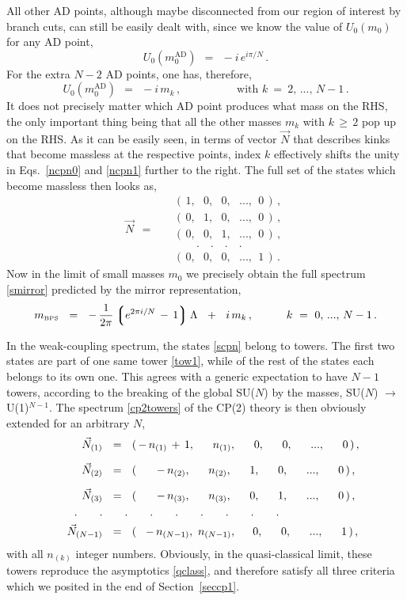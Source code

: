 \documentclass[epsfig,12pt]{article}
\def\beq{\begin{equation}}
\def\eeq{\end{equation}}
\def\beq{\begin{equation}}
\def\eeq{\end{equation}}
\newcommand{\lgr}{\left\lgroup}
\newcommand{\rgr}{\right\rgroup}
\newcommand{\mbps}{m_{\text{\tiny BPS}}}
\begin{document}
	All other AD points, although maybe disconnected from our region of interest by branch cuts, can
	still be easily dealt with, since we know the value of $ U_0(m_0) $ for any AD point,
\beq
	U_0(m_0^\text{AD}) ~~=~~ -i\, e^{i \pi / N}\,.
\eeq
	For the extra $ N - 2 $ AD points, one has, therefore,
\beq
	U_0(m_0^\text{AD}) ~~=~~ -i\, m_k\,,\qquad\qquad\quad \text{with~} k~=~ 2,\,...,\,N-1\,.
\eeq
	It does not precisely matter which AD point produces what mass on the RHS, the only
	important thing being that all the other masses $ m_k $ with $ k \,\ge\, 2 $ pop up on the RHS.
	As it can be easily seen, in terms of vector $ \vec{N} $ that describes kinks 
	that become massless at the respective points,
	index $ k $ effectively shifts the unity in Eqs.~\eqref{ncpn0} and \eqref{ncpn1} further to the right.
	The full set of the states which become massless then looks as,
\beq
\label{scpn}
	\vec{N} ~~=~~ 
			\quad
				\begin{array}{l}
					(\, 1,~~~   0,~~~   0,~~~ ...,~~ 0 \,)\,, \\[1.5mm]
					(\, 0,~~~   1,~~~   0,~~~ ...,~~ 0 \,)\,, \\[1.5mm]
					(\, 0,~~~   0,~~~   1,~~~ ...,~~ 0 \,)\,, \\[0.5mm]
					\quad\quad.\quad.\quad.\quad.         \\
					(\, 0,~~~   0,~~~   0,~~~ ...,~~ 1 \,)\,.
				\end{array} 
\eeq
	Now in the limit of small masses $ m_0 $ we precisely obtain the full spectrum \eqref{smirror} 
	predicted by the mirror representation,
\beq
	\mbps ~~=~~ -\, \frac{1}{2\pi} \lgr e^{2\pi i / N} \,-\, 1 \rgr \Lambda ~~+~~ i\, m_k\,,
	\qquad\quad k~=~ 0,\,...,\,N-1\,.
\eeq

	In the weak-coupling spectrum, the states \eqref{scpn} belong to towers.
	The first two states are part of one same tower	\eqref{tow1}, while of the rest of the states 
	each belongs to its own one.
	This agrees with a generic expectation to have $ N - 1 $ towers, according to the breaking of the 
	global SU($N$) by the masses, SU($N$) $ \to $ U(1)$^{N-1}$.
	The spectrum \eqref{cp2towers} of the CP(2) theory is then obviously extended for an arbitrary $ N $,
\begin{align}
%
\notag
	\vec{N}_{(1)} & ~~=~~ (\, -\,n_{(1)} \,+\, 1,~~~~\; n_{(1)},~~~~\; 0,~~~~\; 0,~~~~\; ...,~~~~\; 0 \,)\,,  
	\\[2mm]
%
\notag
	\vec{N}_{(2)} & ~~=~~ (\, ~~~~~-\,n_{(2)},~~~~\; n_{(2)},~~~~\; 1,~~~~\; 0,~~~~\; ...,~~~~\; 0 \,)\,,
	\\[2mm]
%
\label{cpntowers}
	\vec{N}_{(3)} & ~~=~~ (\, ~~~~~-\,n_{(3)},~~~~\; n_{(3)},~~~~\; 0,~~~~\; 1,~~~~\; ...,~~~~\; 0 \,)\,,
	\\
%
\notag
	\qquad.\qquad.
	              & \qquad.\qquad.\qquad.\qquad.\qquad.\qquad.\qquad.
	\\
%
\notag
	\vec{N}_{(N-1)} & ~~=~~ (\, ~~-\,n_{(N-1)},~ n_{(N-1)},~~~~\, 0,~~~~\; 0,~~~~\; ...,~~~~\; 1 \,)\,,
\end{align}
	with all $ n_{(k)} $ integer numbers.
	Obviously, in the quasi-classical limit, these towers reproduce the asymptotics \eqref{qclass}, and 
	therefore satisfy all three criteria which we posited in the end of Section~\ref{seccp1}.
\end{document}
